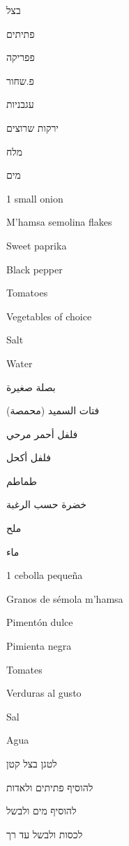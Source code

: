 \rightpagecontent
    {%
        \item \texthebrew{בצל}
        \item \texthebrew{פתיתים}
        \item \texthebrew{פפריקה}
        \item \texthebrew{פ.שחור}
        \item \texthebrew{עגבניות}
        \item \texthebrew{ירקות שרוצים}
        \item \texthebrew{מלח}
        \item \texthebrew{מים}
    }
    {%
        \item 1 small onion
        \item M'hamsa semolina flakes
        \item Sweet paprika
        \item Black pepper
        \item Tomatoes
        \item Vegetables of choice
        \item Salt
        \item Water
    }
    {%
        \item \textarabic{بصلة صغيرة}
        \item \textarabic{فتات السميد (محمصة)}
        \item \textarabic{فلفل أحمر مرحي}
        \item \textarabic{فلفل أكحل}
        \item \textarabic{طماطم}
        \item \textarabic{خضرة حسب الرغبة}
        \item \textarabic{ملح}
        \item \textarabic{ماء}
    }
    {%
        \item 1 cebolla pequeña
        \item Granos de sémola m'hamsa
        \item Pimentón dulce
        \item Pimienta negra
        \item Tomates
        \item Verduras al gusto
        \item Sal
        \item Agua
    }
    {%
        \item \texthebrew{לטגן בצל קטן}
        \item \texthebrew{להוסיף פתיתים ולאדות}
        \item \texthebrew{להוסיף מים ולבשל}
        \item \texthebrew{לכסות ולבשל עד רך}
    }
